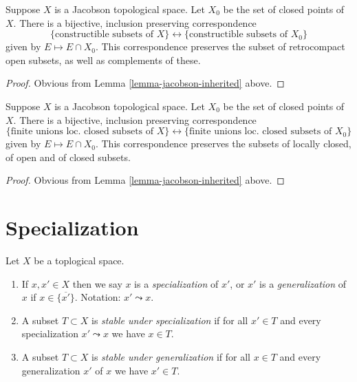 \begin{lemma}
\label{lemma-jacobson-equivalent-constructible}
Suppose $X$ is a Jacobson topological space.
Let $X_0$ be the set of closed points of $X$.
There is a bijective, inclusion preserving correspondence
$$
\{\text{constructible subsets of } X\}
\leftrightarrow
\{\text{constructible subsets of } X_0\}
$$
given by $E \mapsto E \cap X_0$. This correspondence preserves
the subset of retrocompact open subsets, as well as complements
of these.
\end{lemma}

\begin{proof}
Obvious from Lemma \ref{lemma-jacobson-inherited} above.
\end{proof}

\begin{lemma}
\label{lemma-jacobson-equivalent-locally-closed}
Suppose $X$ is a Jacobson topological space.
Let $X_0$ be the set of closed points of $X$.
There is a bijective, inclusion preserving correspondence
$$
\{\text{finite unions loc.\ closed subsets of } X\}
\leftrightarrow
\{\text{finite unions loc.\ closed subsets of } X_0\}
$$
given by $E \mapsto E \cap X_0$. This correspondence preserves
the subsets of locally closed, of open and of closed subsets.
\end{lemma}

\begin{proof}
Obvious from Lemma \ref{lemma-jacobson-inherited} above.
\end{proof}


















\section{Specialization}
\label{section-specialization}

\begin{definition}
\label{definition-specialization}
Let $X$ be a toplogical space.
\begin{enumerate}
\item If $x, x' \in X$ then we say $x$ is a {\it specialization} of $x'$,
or $x'$ is a {\it generalization} of $x$ if $x \in \overline{\{x'\}}$.
Notation: $x' \leadsto x$.
\item A subset $T \subset X$ is {\it stable under specialization}
if for all $x' \in T$ and every specialization $x' \leadsto x$ we have
$x \in T$.
\item A subset $T \subset X$ is {\it stable under generalization}
if for all $x \in T$ and every generalization $x'$ of $x$ we have
$x' \in T$.
\end{enumerate}
\end{definition}

